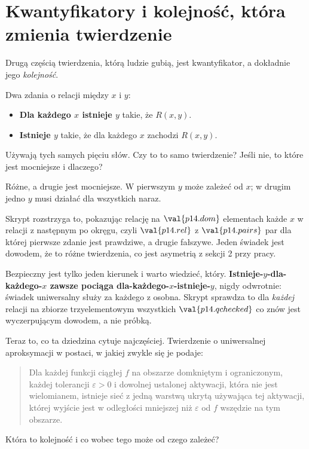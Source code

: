 \section{Kwantyfikatory i kolejność, która zmienia twierdzenie}
\label{sec:P14-quantifiers}

\begin{fr}
Drugą częścią twierdzenia, którą ludzie gubią, jest kwantyfikator, a
dokładnie jego \emph{kolejność}.

Dwa zdania o relacji między $x$ i $y$:

\begin{itemize}
\item \textbf{Dla każdego $x$ istnieje $y$} takie, że $R(x,y)$.
\item \textbf{Istnieje $y$} takie, że dla każdego $x$ zachodzi $R(x,y)$.
\end{itemize}

Używają tych samych pięciu słów. Czy to to samo twierdzenie? Jeśli nie, to
które jest mocniejsze i dlaczego?
\dotline
\nextframe
\end{fr}

\begin{fr}
\begin{ansblock}
Różne, a drugie jest mocniejsze. W pierwszym $y$ może zależeć od $x$; w
drugim jedno $y$ musi działać dla wszystkich naraz.
\end{ansblock}

Skrypt rozstrzyga to, pokazując relację na $\val{p14.dom}$ elementach \dash{}
każde $x$ w relacji z następnym po okręgu, czyli $\val{p14.rel}$ z
$\val{p14.pairs}$ par \dash{} dla której pierwsze zdanie jest prawdziwe, a
drugie fałszywe. Jeden świadek jest dowodem, że to różne twierdzenia, co jest
asymetrią z sekcji 2 przy pracy.

\begin{note}
Bezpieczny jest tylko jeden kierunek i warto wiedzieć, który.
\textbf{Istnieje-$y$-dla-każdego-$x$ zawsze pociąga
dla-każdego-$x$-istnieje-$y$}, nigdy odwrotnie: świadek uniwersalny służy za
każdego z osobna. Skrypt sprawdza to dla \emph{każdej} relacji na zbiorze
trzyelementowym \dash{} wszystkich $\val{p14.qchecked}$ \dash{} co znów jest
wyczerpującym dowodem, a nie próbką.
\end{note}
\end{fr}

\begin{fr}
Teraz to, co ta dziedzina cytuje najczęściej. Twierdzenie o uniwersalnej
aproksymacji w postaci, w jakiej zwykle się je podaje:

\begin{quote}
Dla każdej funkcji ciągłej $f$ na obszarze domkniętym i ograniczonym,
każdej tolerancji $\varepsilon > 0$ i dowolnej ustalonej aktywacji, która nie
jest wielomianem, istnieje sieć z jedną warstwą ukrytą używająca tej
aktywacji, której wyjście jest w odległości mniejszej niż $\varepsilon$ od $f$
wszędzie na tym obszarze.
\end{quote}

Która to kolejność i co wobec tego może od czego zależeć?
\dotline
\nextframe
\end{fr}

